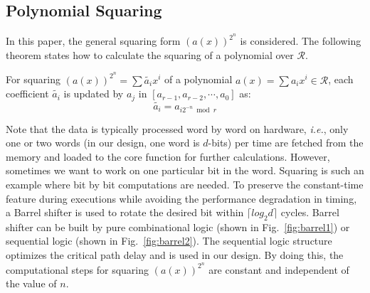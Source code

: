 \documentclass[runningheads]{llncs}
\begin{document}
\subsection{Polynomial Squaring}
\label{sub::square}
In this paper, the general squaring form $(a(x))^{2^n}$ is considered. The following theorem states how to calculate the squaring of a polynomial over $\mathcal{R}$.
\begin{theorem}
For squaring $(a(x))^{2^n}=\sum\widetilde{a_{i}}x^i$ of a polynomial $a(x)=\sum a_ix^i \in \mathcal{R}$, each coefficient $\widetilde{a_{i}}$ is updated by $a_{j}$ in $[{a_{r-1}},{a_{r-2}},\cdots,{a_0}]$ as:
\[
    \widetilde{a_{i}} = a_{i2^{-n}\bmod r}
\]
\end{theorem}


Note that the data is typically processed word by word on hardware, \textit{i.e.}, only one or two words (in our design, one word is $d$-bits) per time are fetched from the memory and loaded to the core function for further calculations. However, sometimes we want to 
work on one particular bit in the word.
Squaring is such an example where bit by bit computations are needed.
To preserve the constant-time feature during executions while
avoiding the performance degradation in timing,
a Barrel shifter
is used to rotate the desired bit within $\lceil log_2d\rceil$ cycles. Barrel shifter can be built by pure combinational logic (shown in Fig.~\ref{fig:barrel1}) or sequential logic (shown in Fig.~\ref{fig:barrel2}). The sequential logic structure optimizes the critical path delay and is used in our design. By doing this, the computational steps for squaring $(a(x))^{2^n}$ are constant and independent of the value of $n$.
\end{document}
